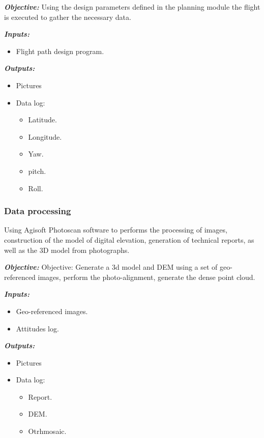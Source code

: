 \textit{\textbf{Objective:}} Using the design parameters defined in the planning module the flight is executed to gather the necessary data.

\textit{\textbf{Inputs:}} 
\begin{itemize}
    \item Flight path design program.
\end{itemize}

\textit{\textbf{Outputs:}} 
\begin{itemize}
    \item Pictures
    \item Data log:\begin{itemize}
        \item Latitude.
        \item Longitude.
        \item Yaw.
        \item pitch.
        \item Roll.
    \end{itemize}
\end{itemize}

\subsubsection{Data processing}
Using  Agisoft Photoscan software to performs the processing of images, construction of the model of digital elevation, generation of technical reports, as well as the 3D model from photographs.

\textit{\textbf{Objective:}} Objective: Generate a 3d model and DEM using a set of geo-referenced images, perform the photo-alignment, generate the dense point cloud.

\textit{\textbf{Inputs:}} 
\begin{itemize}
    \item Geo-referenced images.
    \item Attitudes log.
\end{itemize}

\textit{\textbf{Outputs:}} 
\begin{itemize}
    \item Pictures
    \item Data log:\begin{itemize}
        \item Report.
        \item DEM.
        \item Otrhmosaic.
    \end{itemize}
\end{itemize}


